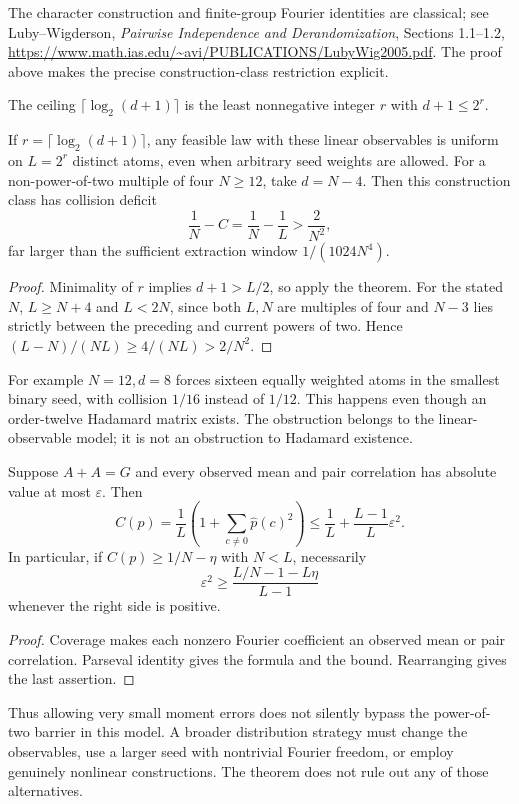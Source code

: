 The character construction and finite-group Fourier identities are
classical; see Luby--Wigderson, \emph{Pairwise Independence and
Derandomization}, Sections 1.1--1.2,
\url{https://www.math.ias.edu/~avi/PUBLICATIONS/LubyWig2005.pdf}.
The proof above makes the precise construction-class restriction explicit.

The ceiling $\lceil\log_2(d+1)\rceil$ is the least nonnegative integer
$r$ with $d+1\le2^r$.
\begin{corollary}
\label{s14:cor:minimum-seed}
If $r=\lceil\log_2(d+1)\rceil$, any feasible law with these linear
observables is uniform on $L=2^r$ distinct atoms, even when arbitrary
seed weights are allowed.
For a non-power-of-two multiple of four $N\ge12$, take $d=N-4$.
Then this construction class has collision deficit
\[
 \frac1N-C=\frac1N-\frac1L>\frac2{N^2},
\]
far larger than the sufficient extraction window $1/(1024N^4)$.
\end{corollary}
\begin{proof}
Minimality of $r$ implies $d+1>L/2$, so apply the theorem.
For the stated $N$, $L\ge N+4$ and $L<2N$, since both $L,N$ are
multiples of four and $N-3$ lies strictly between the preceding and
current powers of two. Hence
$(L-N)/(NL)\ge4/(NL)>2/N^2$.
\end{proof}
For example $N=12,d=8$ forces sixteen equally weighted atoms in the
smallest binary seed, with collision $1/16$ instead of $1/12$.
This happens even though an order-twelve Hadamard matrix exists.
The obstruction belongs to the linear-observable model; it is not
an obstruction to Hadamard existence.

\begin{proposition}\label{s14:prop:approx-character}
Suppose $A+A=G$ and every observed mean and pair correlation has
absolute value at most $\varepsilon$. Then
\[
 C(p)=\frac1L\left(1+\sum_{c\ne0}\widehat p(c)^2\right)
 \le\frac1L+\frac{L-1}{L}\varepsilon^2.
\]
In particular, if $C(p)\ge1/N-\eta$ with $N<L$, necessarily
\[
 \varepsilon^2\ge
 \frac{L/N-1-L\eta}{L-1}
\]
whenever the right side is positive.
\end{proposition}
\begin{proof}
Coverage makes each nonzero Fourier coefficient an observed mean or
pair correlation. Parseval identity gives the formula and the bound.
Rearranging gives the last assertion.
\end{proof}
Thus allowing very small moment errors does not silently bypass the
power-of-two barrier in this model. A broader distribution strategy
must change the observables, use a larger seed with nontrivial Fourier
freedom, or employ genuinely nonlinear constructions. The theorem
does not rule out any of those alternatives.


